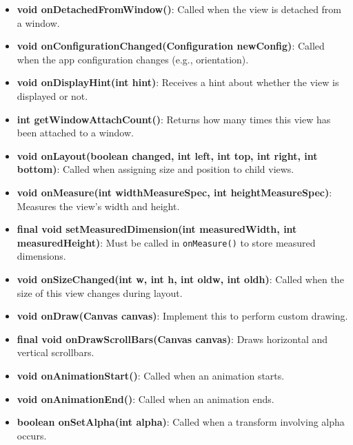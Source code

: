 \documentclass{report}
\begin{document}
\begin{itemize}
\begin{itemize}
                \item \textbf{void onDetachedFromWindow()}:  Called when the view is detached from a window.
                \item \textbf{void onConfigurationChanged(Configuration newConfig)}:  Called when the app configuration changes (e.g., orientation).
                \item \textbf{void onDisplayHint(int hint)}:  Receives a hint about whether the view is displayed or not.
                \item \textbf{int getWindowAttachCount()}:  Returns how many times this view has been attached to a window.
                \item \textbf{void onLayout(boolean changed, int left, int top, int right, int bottom)}:  
                    Called when assigning size and position to child views.

                \item \textbf{void onMeasure(int widthMeasureSpec, int heightMeasureSpec)}:  
                    Measures the view’s width and height.

                \item \textbf{final void setMeasuredDimension(int measuredWidth, int measuredHeight)}:  
                    Must be called in \texttt{onMeasure()} to store measured dimensions.

                \item \textbf{void onSizeChanged(int w, int h, int oldw, int oldh)}:  
                    Called when the size of this view changes during layout.

                \item \textbf{void onDraw(Canvas canvas)}:  
                    Implement this to perform custom drawing.

                \item \textbf{final void onDrawScrollBars(Canvas canvas)}:  
                    Draws horizontal and vertical scrollbars.

                \item \textbf{void onAnimationStart()}:  
                    Called when an animation starts.

                \item \textbf{void onAnimationEnd()}:  
                    Called when an animation ends.

                \item \textbf{boolean onSetAlpha(int alpha)}:  
                    Called when a transform involving alpha occurs.


\end{itemize}
\end{itemize}
\end{document}
